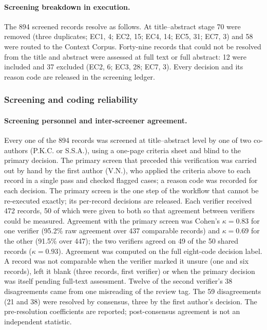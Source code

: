 \documentclass[pdflatex,sn-basic]{sn-jnl}
\begin{document}
\paragraph{Screening breakdown in execution.} The 894 screened records resolve as follows. At title--abstract stage 70 were removed (three duplicates; EC1, 4; EC2, 15; EC4, 14; EC5, 31; EC7, 3) and 58 were routed to the Context Corpus. Forty-nine records that could not be resolved from the title and abstract were assessed at full text or full abstract: 12 were included and 37 excluded (EC2, 6; EC3, 28; EC7, 3). Every decision and its reason code are released in the screening ledger.

\subsubsection{Screening and coding reliability}\label{sec:coding}\label{sec:reliability}

\paragraph{Screening personnel and inter-screener agreement.} Every one of the 894 records was screened at title--abstract level by one of two co-authors (P.K.C. or S.S.A.), using a one-page criteria sheet and blind to the primary decision. The primary screen that preceded this verification was carried out by hand by the first author (V.N.), who applied the criteria above to each record in a single pass and checked flagged cases; a reason code was recorded for each decision. The primary screen is the one step of the workflow that cannot be re-executed exactly; its per-record decisions are released. Each verifier received 472 records, 50 of which were given to both so that agreement between verifiers could be measured. Agreement with the primary screen was Cohen's $\kappa = 0.83$ for one verifier (95.2\% raw agreement over 437 comparable records) and $\kappa = 0.69$ for the other (91.5\% over 447); the two verifiers agreed on 49 of the 50 shared records ($\kappa = 0.93$). Agreement was computed on the full eight-code decision label. A record was not comparable when the verifier marked it unsure (one and six records), left it blank (three records, first verifier) or when the primary decision was itself pending full-text assessment. Twelve of the second verifier's 38 disagreements came from one misreading of the review tag. The 59 disagreements (21 and 38) were resolved by consensus, three by the first author's decision. The pre-resolution coefficients are reported; post-consensus agreement is not an independent statistic.
\end{document}
